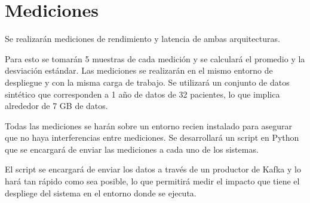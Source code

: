 \section{Mediciones}

Se realizarán mediciones de rendimiento y latencia de ambas arquitecturas.\newline

Para esto se tomarán 5 muestras de cada medición y se calculará el promedio y la desviación estándar.
Las mediciones se realizarán en el mismo entorno de despliegue y con la misma carga de trabajo.
Se utilizará un conjunto de datos sintético que corresponden a 1 año de datos de 32 pacientes,
lo que implica alrededor de 7 GB de datos. \newline

Todas las mediciones se harán sobre un entorno recien instalado para asegurar que no haya interferencias entre mediciones.
Se desarrollará un script en Python que se encargará de enviar las mediciones a cada uno de los sistemas.\newline

El script se encargará de enviar los datos a través de un productor de Kafka y lo hará tan rápido como sea posible,
lo que permitirá medir el impacto que tiene el despliege del sistema en el entorno donde se ejecuta.

\newpage